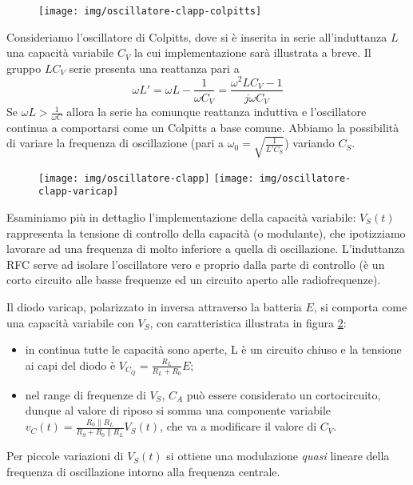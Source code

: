 \begin{figure}[hbt]
	\centering
	\texttt{[image: img/oscillatore-clapp-colpitts]}
	\caption{}
	\label{fig:clapp}
\end{figure}

Consideriamo l'oscillatore di Colpitts, dove si è inserita in serie all'induttanza $L$ una capacità variabile $C_V$ la cui implementazione sarà illustrata a breve.
Il gruppo $LC_V$ serie presenta una reattanza pari a
\[
\omega L' = \omega L - \frac{1}{\omega C_V}
 = \frac{\omega^2 LC_V-1}{j \omega C_V}
\]
Se $\omega L > \frac{1}{\omega C}$ allora la serie ha comunque reattanza induttiva e l'oscillatore continua a comportarsi come un Colpitts a base comune. Abbiamo la possibilità di variare la frequenza di oscillazione (pari a $\omega_0 = \sqrt{\frac{1}{L'C_S}}$) variando $C_S$.

\begin{figure}[hbt]
	\centering
	\texttt{[image: img/oscillatore-clapp]}
	\texttt{[image: img/oscillatore-clapp-varicap]}
	\caption{}
	\label{fig:varicap}
\end{figure}

Esaminiamo più in dettaglio l'implementazione della capacità variabile: $V_S(t)$ rappresenta la tensione di controllo della capacità (o modulante), che ipotizziamo lavorare ad una frequenza di molto inferiore a quella di oscillazione. L'induttanza RFC serve ad isolare l'oscillatore vero e proprio dalla parte di controllo (è un corto circuito alle basse frequenze ed un circuito aperto alle radiofrequenze).

Il diodo varicap, polarizzato in inversa attraverso la batteria $E$, si comporta come una capacità variabile con $V_S$, con caratteristica illustrata in figura \ref{fig:varicap}:
\begin{itemize}
\item in continua tutte le capacità sono aperte, L è un circuito chiuso e la tensione ai capi del diodo è $V_{C_Q} = \frac{R_L}{R_L + R_0} E$;
\item nel range di frequenze di $V_S$, $C_A$ può essere considerato un cortocircuito, dunque al valore di riposo si somma una componente variabile
$v_{C}(t) = \frac{R_0 \parallel R_L }{R_S + R_0\parallel R_L} V_S(t)$, che va a modificare il valore di $C_V$.
\end{itemize}
Per piccole variazioni di $V_S(t)$ si ottiene una modulazione \textit{quasi} lineare della frequenza di oscillazione intorno alla frequenza centrale.

